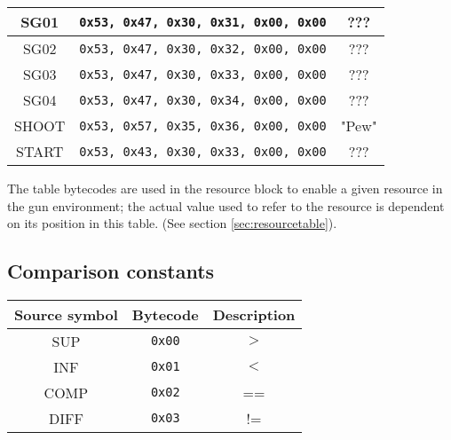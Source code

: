 \documentclass[12pt,a4paper]{scrbook}
\begin{document}
\begin{center}
\begin{tabular}{ | c | c || c | }
    SG01 & \texttt{0x53, 0x47, 0x30, 0x31, 0x00, 0x00} & ???  \\ \hline
    SG02 & \texttt{0x53, 0x47, 0x30, 0x32, 0x00, 0x00} & ???  \\ \hline
    SG03 & \texttt{0x53, 0x47, 0x30, 0x33, 0x00, 0x00} & ???  \\ \hline
    SG04 & \texttt{0x53, 0x47, 0x30, 0x34, 0x00, 0x00} & ???  \\ \hline  
    SHOOT & \texttt{0x53, 0x57, 0x35, 0x36, 0x00, 0x00} & "Pew"  \\ \hline
    START & \texttt{0x53, 0x43, 0x30, 0x33, 0x00, 0x00} & ???  \\ \hline
  \end{tabular}
\end{center}
The table bytecodes are used in the resource block to enable a given resource in the gun 
environment; the actual value used to refer to the resource is dependent on its position in this
table.  (See section \ref{sec:resourcetable}).	


\subsection{Comparison constants}
\label{sec:compconsts}
\begin{center}
  \begin{tabular}{ | c | c || c | }
    \hline
    Source symbol & Bytecode & Description \\ \hline \hline
    SUP & \texttt{0x00} & $>$  \\ \hline
    INF & \texttt{0x01} & $<$  \\ \hline
    COMP & \texttt{0x02} & ==  \\ \hline
    DIFF & \texttt{0x03} & !=  \\ \hline
    
  \end{tabular}
\end{center}

\end{document}
